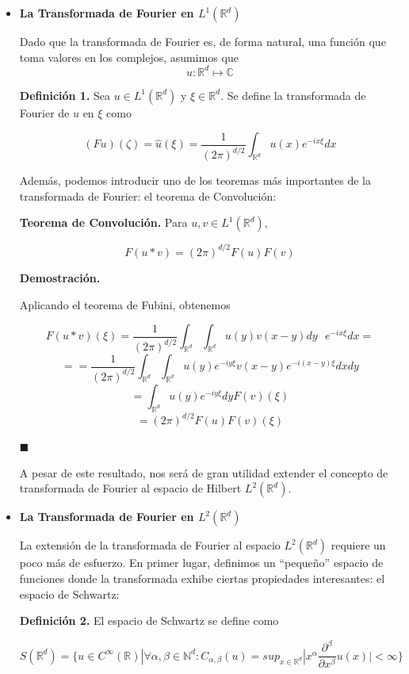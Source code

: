\begin{itemize}
	\item \textbf{La Transformada de Fourier en $L^1(\mathbb{R}^d)$}
	
	Dado que la transformada de Fourier es, de forma natural, una función que toma valores en los complejos, asumimos que
	$$u: \mathbb{R}^d \mapsto \mathbb{C}$$
	
	\textbf{Definición 1.} Sea $u \in L^1(\mathbb{R}^d)$ y $\xi \in \mathbb{R}^d$. Se define la transformada de Fourier de $u$ en $\xi$ como 
	
	$$(F u)(\zeta) = \hat{u}(\xi) = \frac{1}{(2\pi)^{d/2}} \int_{\mathbb{R}^d} u(x) e^{-ix\xi}dx$$


Además, podemos introducir uno de los teoremas más importantes de la transformada de Fourier: el teorema de Convolución: 

\textbf{Teorema de Convolución.} Para $u, v \in L^1(\mathbb{R}^d)$,

$$ F(u*v) = (2\pi)^{d/2}F(u)F(v)$$

\textbf{Demostración.}


Aplicando el teorema de Fubini, obtenemos

$$F(u*v)(\xi) = \frac{1}{(2\pi)^{d/2}} \int_{\mathbb{R}^d} \int_{\mathbb{R}^d} u(y) v(x-y) dy\text{ } e^{-ix\xi} dx = $$
$$ == \frac{1}{(2\pi)^{d/2}} \int_{\mathbb{R}^d} \int_{\mathbb{R}^d} u(y)e^{-iy\xi}v(x-y)e^{-i(x-y)\xi}dxdy$$
$$ = \int_{\mathbb{R}^d} u(y) e^{-iy\xi} dy F(v)(\xi)$$
$$ = (2\pi)^{d/2}F(u)F(v)(\xi)$$

\hfill$\blacksquare$

A pesar de este resultado, nos será de gran utilidad extender el concepto de transformada de Fourier al espacio de Hilbert $L^2(\mathbb{R}^d)$.

\item \textbf{La Transformada de Fourier en $L^2(\mathbb{R}^d)$}

La extensión de la transformada de Fourier al espacio $L^2(\mathbb{R}^d)$ requiere un poco más de esfuerzo. En primer lugar, definimos un ``pequeño'' espacio de funciones donde la transformada exhibe ciertas propiedades interesantes: el espacio de Schwartz:

\textbf{Definición 2.} El espacio de Schwartz se define como 

$$S(\mathbb{R}^d) = \{u \in C^\infty(\mathbb{R}) | \forall \alpha,\beta \in \mathbb{N}^d: C_{\alpha,\beta}(u) = sup_{x \in \mathbb{R}^d} |x^\alpha \frac{\partial^\beta}{\partial x^\beta}u(x)| < \infty \}$$


\end{itemize}
